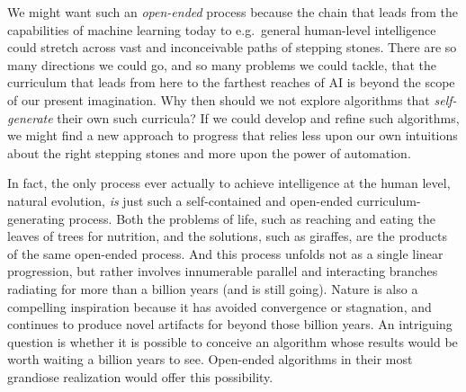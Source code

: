 \documentclass{article}
\newcommand{\todo}[1]{\comments{\textcolor{red}{[TODO: #1]}}}
\newcommand{\jl}[1]{\comments{\textcolor{magenta}{[Joel: #1]}}}
\newcommand{\ks}[1]{\comments{\textcolor{purple}{[Ken: #1]}}}
\newcommand{\rw}[1]{\comments{\textcolor{blue}{[Rui: #1]}}}
\newcommand{\comments}[1]{#1}
\begin{document}
We might want such an \emph{open-ended} \cite{standish:ijcia03,langdon:metas05,bedau:alife08, ken:oriley17,taylor:alife16} %
process because the chain that leads from the capabilities of machine learning today to e.g.\ general human-level intelligence could stretch across vast and inconceivable paths of stepping stones.  There are so many directions we could go, and so many problems we could tackle, that the curriculum that leads from here to the farthest reaches of AI is beyond the scope of our present imagination.  Why then should we not explore algorithms that \emph{self-generate} their own such curricula?  If we could develop and refine such algorithms, we might find a new approach to progress that relies less upon our own intuitions about the right stepping stones and more upon the power of automation.

In fact, the only process ever actually to achieve intelligence at the human level, natural evolution, \emph{is} just such a self-contained and open-ended curriculum-generating process.  Both the problems of life, such as reaching and eating the leaves of trees for nutrition,
and the solutions, such as giraffes, are the products of the same open-ended process.  And this process unfolds not as a single linear progression,
but rather involves innumerable parallel and interacting branches radiating for more than a billion years (and is still going).  Nature is also a compelling inspiration because it has avoided convergence or stagnation, and continues to produce novel artifacts for beyond those billion years.  An intriguing question is whether it is possible to conceive an algorithm whose results would be worth waiting a billion years to see.  Open-ended algorithms in their most grandiose realization would offer this possibility.  
\end{document}
